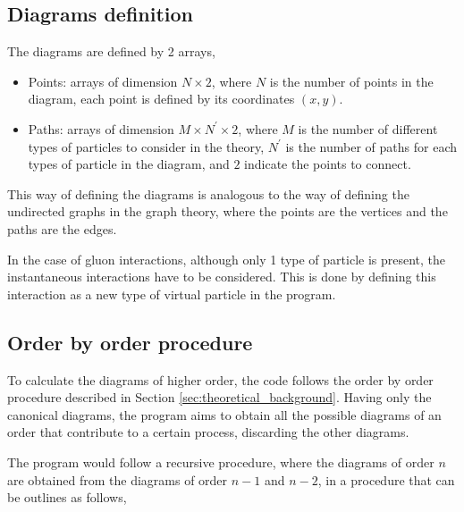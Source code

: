 \documentclass[11pt,a4paper,twoside,pdf]{article}
\numberwithin{equation}{section}
\begin{document}
\subsection{Diagrams definition}

The diagrams are defined by 2 arrays, 
\begin{itemize}
    \item Points: arrays of dimension $N \times 2$, where $N$ is the number of 
    points in the diagram, each point is defined by its coordinates $(x,y)$.
    \item Paths: arrays of dimension $M \times N^\prime \times 2$, where $M$ is the
    number of different types of particles to consider in the theory, $N^\prime$ 
    is the number of paths for each types of particle in the diagram, and $2$ indicate
    the points to connect.
\end{itemize}

This way of defining the diagrams is analogous to the way of defining the undirected 
graphs in the graph theory, where the points are the vertices and the paths are the 
edges. 

In the case of gluon interactions, although only 1 type of particle is present, the
instantaneous interactions have to be considered. This is done by defining this 
interaction as a new type of virtual particle in the program.


\subsection{Order by order procedure}

To calculate the diagrams of higher order, the code follows the order by order 
procedure described in Section \ref{sec:theoretical_background}. Having only the
canonical diagrams, the program aims to obtain all the possible diagrams of an order
that contribute to a certain process, discarding the other diagrams.

The program would follow a recursive procedure, where the diagrams of order $n$ are
obtained from the diagrams of order $n-1$ and $n-2$, in a procedure that can be outlines
as follows,
\end{document}

